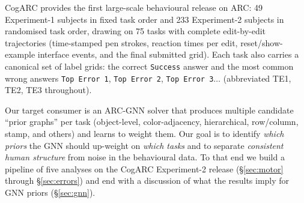 \documentclass[11pt]{article}
\begin{document}
CogARC \cite{cogarc2024} provides the first large-scale behavioural
release on ARC: 49 Experiment-1 subjects in fixed task order and
233 Experiment-2 subjects in randomised task order, drawing on 75
tasks with complete edit-by-edit trajectories (time-stamped pen
strokes, reaction times per edit, reset/show-example interface
events, and the final submitted grid). Each task also carries a
canonical set of label grids: the correct \texttt{Success} answer
and the most common wrong answers \texttt{Top Error 1},
\texttt{Top Error 2}, \texttt{Top Error 3}$\ldots$ (abbreviated TE1,
TE2, TE3 throughout).

Our target consumer is an ARC-GNN solver that produces
multiple candidate ``prior graphs'' per task
(object-level, color-adjacency, hierarchical, row/column, stamp, and
others) and learns to weight them. Our goal is to identify
\emph{which priors} the GNN should up-weight on \emph{which tasks}
and to separate \emph{consistent human structure} from noise in
the behavioural data. To that end we build a pipeline of five
analyses on the CogARC Experiment-2 release (\S\ref{sec:motor}
through \S\ref{sec:errors}) and end with a discussion of what the
results imply for GNN priors (\S\ref{sec:gnn}).
\end{document}
